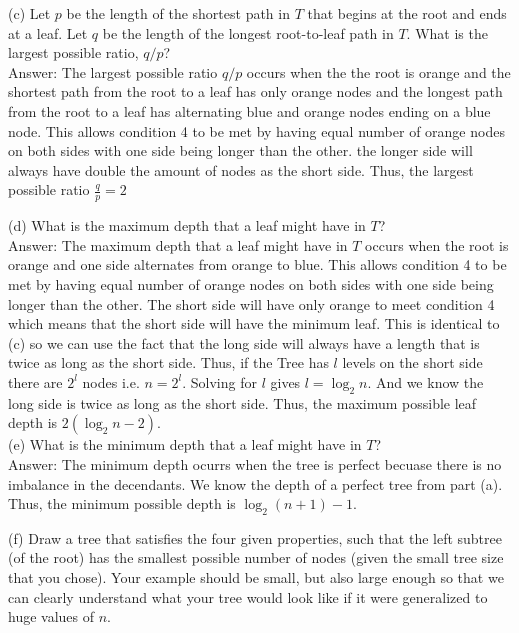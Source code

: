 \documentclass[12pt]{article}
\begin{document}
\begin{enumerate}
(c) Let $p$ be the length of the shortest path in $T$ that begins at the root and ends at a leaf. Let $q$ be the length of the longest root-to-leaf path in $T$.   
What is the largest possible ratio,  $q / p$?\\
{\color{blue} Answer: The largest possible ratio $q/p$ occurs when the the root is orange and the shortest path from the root to a leaf has only orange nodes and the 
longest path from the root to a leaf has alternating blue and orange nodes ending on a blue node. This allows condition 4 to be met by having equal number of orange 
nodes on both sides with one side being longer than the other. the longer side will always have double the amount of nodes as the short side. Thus, the largest possible
ratio $\frac{q}{p} = 2$\\
}

(d) What is the maximum depth that a leaf might have in $T$?\\
{\color{blue} Answer: The maximum depth that a leaf might have in $T$ occurs when the root is orange and one side alternates from orange to blue. 
This allows condition 4 to be met by having equal number of orange nodes on both sides with one side being longer than the other. The short side will have only orange to 
meet condition 4 which means that the short side will have the minimum leaf. This is identical to (c) so we can use the fact that the long side will always have 
a length that is twice as long as the short side. Thus, if the Tree has $l$ levels on the short side there are $2^l$ nodes i.e. $n = 2^l$. Solving for $l$ 
gives $l = \log_2n$. And we know the long side is twice as long as the short side. Thus, the maximum possible leaf depth is $2(\log_2n-2)$.\\
}
(e) What is the minimum depth that a leaf might have in $T$?\\
{\color{blue} Answer: The minimum depth ocurrs when the tree is perfect becuase there is no imbalance in the decendants. We know the depth of a perfect tree from part (a). 
Thus, the minimum possible depth is $\log_2(n+1) - 1$.\\

}

(f) Draw a tree that satisfies the four given properties, such that the left subtree (of the root) has the smallest possible number of nodes (given the small tree size that you chose).  Your example should be small, but also large enough so that we can clearly understand what your tree would look like if it were generalized to  huge values of $n$.


\end{enumerate}
\end{document}
